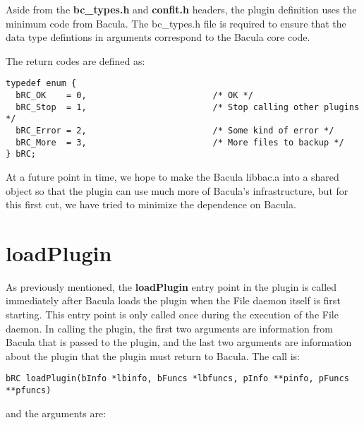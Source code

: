 Aside from the {\bf bc\_types.h} and {\bf confit.h} headers, the plugin
definition uses the minimum code from Bacula.  The bc\_types.h file is required
to ensure that the data type defintions in arguments correspond to the Bacula
core code.

The return codes are defined as:
\begin{verbatim}
typedef enum {
  bRC_OK    = 0,                         /* OK */
  bRC_Stop  = 1,                         /* Stop calling other plugins */
  bRC_Error = 2,                         /* Some kind of error */
  bRC_More  = 3,                         /* More files to backup */
} bRC;
\end{verbatim}


At a future point in time, we hope to make the Bacula libbac.a into a
shared object so that the plugin can use much more of Bacula's
infrastructure, but for this first cut, we have tried to minimize the
dependence on Bacula.

\section{loadPlugin}
As previously mentioned, the {\bf loadPlugin} entry point in the plugin
is called immediately after Bacula loads the plugin when the File daemon
itself is first starting.  This entry point is only called once during the
execution of the File daemon.  In calling the
plugin, the first two arguments are information from Bacula that
is passed to the plugin, and the last two arguments are information
about the plugin that the plugin must return to Bacula.  The call is:

\begin{verbatim}
bRC loadPlugin(bInfo *lbinfo, bFuncs *lbfuncs, pInfo **pinfo, pFuncs **pfuncs)
\end{verbatim}

and the arguments are:

